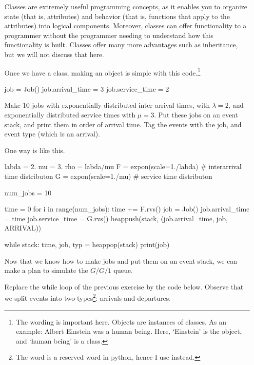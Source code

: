 Classes are extremely useful programming concepts, as it enables you to organize state (that is, attributes) and behavior (that is, functions that apply to the attributes) into logical components. Moreover, classes can offer functionality to a programmer without the programmer needing to understand how this functionality is built. Classes offer many more advantages such as inheritance, but we will not discuss that here. 

Once we have a class, making an object is simple with this code.\footnote{The wording is important here. Objects are instances of classes. As an example: Albert Einstein was a human being. Here, `Einstein' is the object, and `human being' is a class.}

\begin{pyblock}
job = Job()
job.arrival_time = 3
job.service_time = 2
\end{pyblock}

\begin{exercise}\label{ex:3}
  Make $10$ jobs with exponentially distributed inter-arrival times, with $\lambda=2$,  and exponentially distributed service times with $\mu=3$. Put these jobs on an event stack, and print them in order of arrival time. Tag the events with the job, and event type (which is an arrival).
  \begin{solution}
One way is like this.     
    \begin{pyblock}
labda = 2.
mu = 3.
rho = labda/mu
F = expon(scale=1./labda)  # interarrival time distributon
G = expon(scale=1./mu)  # service time distributon

num_jobs = 10

time = 0
for i in range(num_jobs):
    time += F.rvs()
    job = Job()
    job.arrival_time = time
    job.service_time = G.rvs()
    heappush(stack, (job.arrival_time, job, ARRIVAL))


while stack:
    time, job, typ = heappop(stack)
    print(job)
    
    \end{pyblock}
  \end{solution}
\end{exercise}

Now that we know how to make jobs and put them on an event stack, we can make a plan to simulate the $G/G/1$ queue. 

  Replace the while loop of the previous exercise by the code below. Observe that we split events into two types\footnote{The word  is a reserved word in python, hence I use  instead.}: arrivals and departures. 

